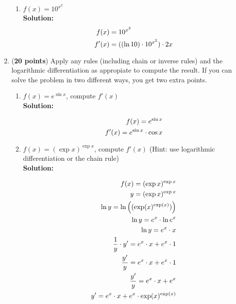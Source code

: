 \documentclass[a4paper]{article}
\begin{document}
\begin{enumerate}
\begin{enumerate}
	
	\item $f(x) = 10^{x^2}$\\
	\textbf{Solution:}\\
		
\begin{align*}
	f(x) &= 10^{x^2}\notag\\
	f'(x) &= ((\ln 10) \cdot 10^{x^2}) \cdot 2x\notag
\end{align*}			
	
	
\end{enumerate}




\item (\textbf{20 points}) Apply any rules (including chain or inverse rules) and the logarithmic differentiation as appropiate to compute the result. If you can solve the problem in two different ways, you get two extra points.

	
\begin{enumerate}
	\item $f(x) = e^{\sin x}$, compute $f'(x)$\\
	\textbf{Solution:}\\
	
	
\begin{align*}
	f(x) =  e^{\sin x}\notag\\
	f'(x) = e^{\sin x} \cdot \cos x\notag
\end{align*}


	
	
	\item $f(x) = (\exp x)^{\exp x}$, compute $f'(x)$ (Hint: use logarithmic differentiation or the chain rule)\\
	\textbf{Solution:}\\
	
	
\begin{align*}
	f(x) = (\exp x)^{\exp x}\notag\\
	y = (\exp x)^{\exp x}\notag\\
	\ln y = \ln \left( (\exp(x)^{\exp(x)})  \right)\notag\\
	\ln y = e^x \cdot \ln e^x\notag\\
	\ln y = e^x \cdot x\notag\\
	\frac{1}{y} \cdot y' = e^x \cdot x + e^x \cdot 1\notag\\
	\frac{y'}{y} = e^x \cdot x + e^x \cdot 1\notag\\
	\frac{y'}{y} = e^x \cdot x + e^x\notag\\
	y' = e^x \cdot x + e^x \cdot \exp(x)^{\exp(x)}\notag
\end{align*}	
	

\end{enumerate}
\end{enumerate}
\end{document}
